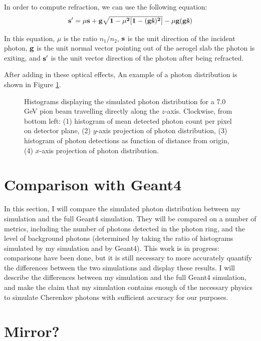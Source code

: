 In order to compute refraction, we can use the following equation: 
\begin{equation}
\bf{s'} = \mu\bf{s} + \bf{g}\sqrt{1 - \mu^2[1-(\bf{g \dot s})^2]} - \mu \bf{g}(\bf{g \dot s})
\label{eq:refract}
\end{equation}

In this equation, $\mu$ is the ratio $n_1/n_2$, $\bf{s}$ is the unit direction of the incident photon, $\bf{g}$ is the unit normal vector pointing out of the aerogel slab the photon is exiting, and $\bf{s'}$ is the unit vector direction of the photon after being refracted.

After adding in these optical effects, An example of a photon distribution is shown in Figure \ref{fig:photonHist}.

\begin{figure}[]
\centering
{}
\caption[Example of simulated photon distribution for centered 7.0 GeV pion beam]{Histograms displaying the simulated photon distribution for a 7.0 GeV pion beam travelling directly along the $z$-axis. Clockwise, from bottom left: (1) histogram of mean detected photon count per pixel on detector plane, (2) $y$-axis projection of photon distribution, (3) histogram of photon detections as function of distance from origin, (4) $x$-axis projection of photon distribution. }
\label{fig:photonHist} 
\end{figure}


\section{Comparison with Geant4} 
In this section, I will compare the simulated photon distribution between my simulation and the full Geant4 simulation.
They will be compared on a number of metrics, including the number of photons detected in the photon ring, and the level of background photons (determined by taking the ratio of histograms simulated by my simulation and by Geant4). This work is in progress: comparisons have been done, but it is still necessary to more accurately quantify the differences between the two simulations and display these results. I will describe the differences between my simulation and the full Geant4 simulation, and make the claim that my simulation contains enough of the necessary physics to simulate Cherenkov photons with sufficient accuracy for our purposes.

\section{Mirror?}

\endinput

Any text after an \endinput is ignored.
You could put scraps here or things in progress.
